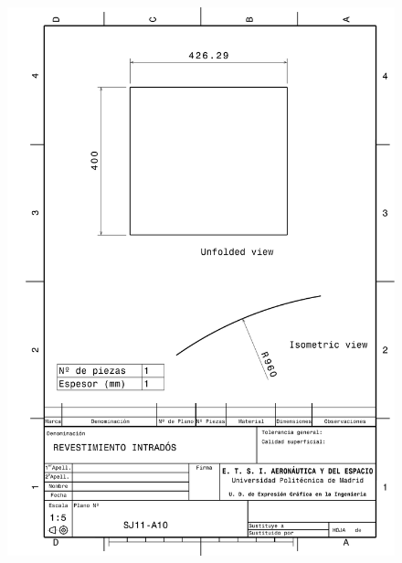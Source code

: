 \begin{figure}
    \centering
    \includegraphics[width=\linewidth]{Figures//Planos/RINT.pdf}
\end{figure}

